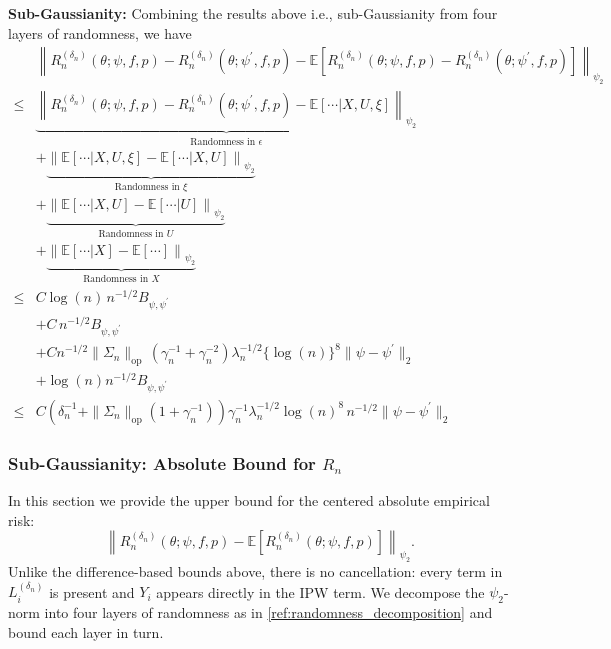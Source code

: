 \documentclass[12pt]{article}
\newcommand{\E}{\mathbb{E}}
\begin{document}
\noindent \textbf{Sub-Gaussianity:} Combining the results above i.e., sub-Gaussianity from four layers of randomness, we have
\begin{align*}
    &\left\|R_n^{(\delta_n)}(\theta;\psi,f,p)-R_n^{({\delta_n})}(\theta;\psi^\prime,f,p)-\E\left[R_n^{(\delta_n)}(\theta;\psi,f,p)-R_n^{({\delta_n})}(\theta;\psi^\prime,f,p)\right]\right\|_{\psi_2}\\
    \leq & \underbrace{\left\|R_n^{(\delta_n)}(\theta;\psi,f,p)-R_n^{({\delta_n})}(\theta;\psi^\prime,f,p)-\E\left[\cdots|X,U,\xi\right]\right\|_{\psi_2}}_{\text{Randomness in $\epsilon$}}\\
    & + \underbrace{\left\|\E\left[\cdots|X,U,\xi\right]-\E\left[\cdots|X,U\right]\right\|_{\psi_2}}_{\text{Randomness in $\xi$}}\\
    & + \underbrace{\left\|\E\left[\cdots|X,U\right]-\E\left[\cdots|U\right]\right\|_{\psi_2}}_{\text{Randomness in $U$}}\\
    & + \underbrace{\left\|\E\left[\cdots|X\right]-\E\left[\cdots\right]\right\|_{\psi_2}}_{\text{Randomness in $X$}}\\
    \leq & C\log(n)\, n^{-1/2} B_{\psi,\psi^\prime}\\
    & + C\, n^{-1/2} B_{\psi,\psi^\prime}\\
    & +Cn^{-1/2}\|\Sigma_n\|_{\mathrm{op}}\,(\gamma_n^{-1}+\gamma_n^{-2})\lambda_n^{-1/2}\{\log(n)\}^8\|\psi - \psi^\prime\|_2\\
    & +\log(n)n^{-1/2}B_{\psi,\psi^\prime}\\
    \leq & C\left(\delta_n^{-1}+\|\Sigma_n\|_{\mathrm{op}}(1+\gamma_n^{-1})\right)\gamma_n^{-1}\lambda_n^{-1/2}\log(n)^{8}\,n^{-1/2}\|\psi - \psi^\prime\|_2
\end{align*}

\subsubsection{Sub-Gaussianity: Absolute Bound for $R_n$}
\label{subsec:sub-gaussian-absolute}

In this section we provide the upper bound for the centered absolute empirical risk:
$$\left\|R_n^{(\delta_n)}(\theta;\psi,f,p)-\E\left[R_n^{(\delta_n)}(\theta;\psi,f,p)\right]\right\|_{\psi_2}.$$
Unlike the difference-based bounds above, there is no cancellation: every term in $L_i^{(\delta_n)}$ is present and $Y_i$ appears directly in the IPW term. We decompose the $\psi_2$-norm into four layers of randomness as in \eqref{ref:randomness_decomposition} and bound each layer in turn.
\end{document}
